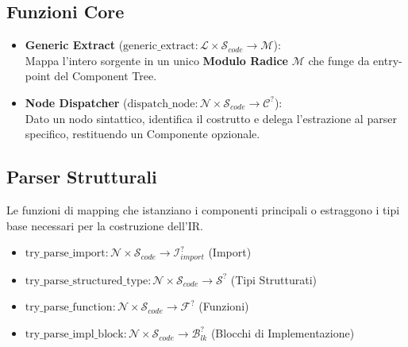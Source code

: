 \subsection{Funzioni Core}
\begin{itemize}
  \item \textbf{Generic Extract} ($\text{generic\_extract} :
    \mathcal{L} \times \mathcal{S}_{code} \to \mathcal{M}$): \\
    Mappa l'intero sorgente in un unico \textbf{Modulo Radice}
    $\mathcal{M}$ che funge da entry-point del Component Tree.
  \item \textbf{Node Dispatcher} ($\text{dispatch\_node} :
    \mathcal{N} \times \mathcal{S}_{code} \to \mathcal{C}^?$): \\
    Dato un nodo sintattico, identifica il costrutto e delega
    l'estrazione al parser specifico, restituendo un Componente opzionale.
\end{itemize}

\subsection{Parser Strutturali}
Le funzioni di mapping che istanziano i componenti principali o
estraggono i tipi base necessari per la costruzione dell'IR.
\begin{itemize}
  \item $\text{try\_parse\_import} : \mathcal{N} \times
    \mathcal{S}_{code} \to \mathcal{I}_{import}^?$ (Import)
  \item $\text{try\_parse\_structured\_type} : \mathcal{N} \times
    \mathcal{S}_{code} \to \mathcal{S}^?$ (Tipi Strutturati)
  \item $\text{try\_parse\_function} : \mathcal{N} \times
    \mathcal{S}_{code} \to \mathcal{F}^?$ (Funzioni)
  \item $\text{try\_parse\_impl\_block} : \mathcal{N} \times
    \mathcal{S}_{code} \to \mathcal{B}_{lk}^?$ (Blocchi di Implementazione)
\end{itemize}

